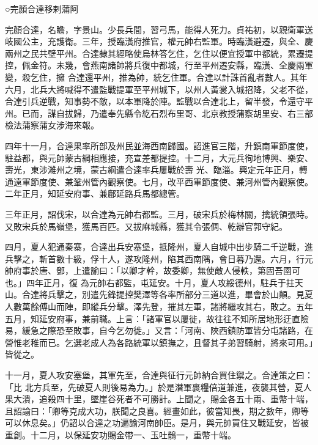 
\begin{pinyinscope}

 ○完顏合達移剌蒲阿



 完顏合達，名瞻，字景山。少長兵間，習弓馬，能得人死力。貞祐初，以親衛軍送岐國公主，充護衛。三年，授臨潢府推官，權元帥右監軍。時臨潢避遷，與全、慶兩州之民共壁平州。合達隸其經略使烏林答乞住，乞住以便宜授軍中都統，累遷提控，佩金符。未幾，會燕南諸帥將兵復中都城，行至平州遷安縣，臨潢、全慶兩軍變，殺乞住，擁
 合達還平州，推為帥，統乞住軍。合達以計誅首亂者數人。其年六月，北兵大將喊得不遣監戰提軍至平州城下，以州人黃裳入城招降，父老不從，合達引兵逆戰，知事勢不敵，以本軍降於陣。監戰以合達北上，留半發，令還守平州。已而，謀自拔歸，乃遣奉先縣令紇石烈布里哥、北京教授蒲察胡里安、右三部檢法蒲察蒲女涉海來報。



 四年十一月，合達果率所部及州民並海西南歸國。詔進官三階，升鎮南軍節度使，駐益都，與元帥蒙古綱相應接，充宣差都提控。十二月，大元兵徇地博興、樂安、壽光，東涉濰州之境，蒙古綱遣合達率兵屢戰於壽
 光、臨淄。興定元年正月，轉通遠軍節度使、兼鞏州管內觀察使。七月，改平西軍節度使、兼河州管內觀察使。二年正月，知延安府事、兼鄜延路兵馬都總管。



 三年正月，詔伐宋，以合達為元帥右都監。三月，破宋兵於梅林關，擒統領張時。又敗宋兵於馬嶺堡，獲馬百匹。又拔麻城縣，獲其令張倜、乾辦官郭守紀。



 四月，夏人犯通秦寨，合達出兵安塞堡，抵隆州，夏人自城中出步騎二千逆戰，進兵擊之，斬首數十級，俘十人，遂攻隆州，陷其西南隅，會日暮乃還。六月，行元帥府事於唐、鄧，上遣諭曰：「以卿才幹，故委卿，無使敵人侵軼，第固吾圉可也。」四年正月，復
 為元帥右都監，屯延安。十月，夏人攻綏德州，駐兵于拄天山。合達將兵擊之，別遣先鋒提控樊澤等各率所部分三道以進，畢會於山顛。見夏人數萬餘傅山而陣，即縱兵分擊。澤先登，摧其左軍，諸將繼攻其右，敗之。五年五月，知延安府事，兼前職。上言：「諸軍官以屢徙，故往往不知所居地形迂直險易，緩急之際恐至敗事，自今乞勿徙。」又言：「河南、陜西鎮防軍皆分屯諸路，在營惟老稚而已。乞選老成人為各路統軍以鎮撫之，且督其子弟習騎射，將來可用。」皆從之。



 十一月，夏人攻安塞堡，其軍先至，合達與征行元帥納合買住禦之。合達策之曰：「比
 北方兵至，先破夏人則後易為力。」於是潛軍裹糧倍道兼進，夜襲其營，夏人果大潰，追殺四十里，墜崖谷死者不可勝計。上聞之，賜金各五十兩、重幣十端，且詔諭曰：「卿等克成大功，朕聞之良喜。經畫如此，彼當知畏，期之數年，卿等可以休息矣。」仍詔以合達之功遍諭河南帥臣。是月，與元帥買住又戰延安，皆被重創。十二月，以保延安功賜金帶一、玉吐鶻一，重幣十端。




\end{pinyinscope}
